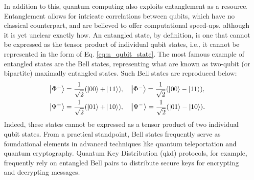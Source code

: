 In addition to this, quantum computing also exploits entanglement as a resource. Entanglement allows for intricate correlations between qubits, which have no classical counterpart, and are believed to offer computational speed-ups, although it is yet unclear exactly how. An entangled state, by definition, is one that cannot be expressed as the tensor product of individual qubit states, i.e., it cannot be represented in the form of Eq. \ref{eq:n_qubit_state}. The most famous example of entangled states are the Bell states, representing what are known as two-qubit (or bipartite) maximally entangled states. Such Bell states are reproduced below:
\begin{equation} %
  \begin{aligned}
  \ket{\Phi^+} &= \frac{1}{\sqrt{2}}(\ket{00} + \ket{11}), \quad
  \ket{\Phi^-} = \frac{1}{\sqrt{2}}(\ket{00} - \ket{11}), \\
  \ket{\Psi^+} &= \frac{1}{\sqrt{2}}(\ket{01} + \ket{10}), \quad
  \ket{\Psi^-} = \frac{1}{\sqrt{2}}(\ket{01} - \ket{10}).
  \end{aligned}
\end{equation}
Indeed, these states cannot be expressed as a tensor product of two individual qubit states. From a practical standpoint, Bell states frequently serve as foundational elements in advanced techniques like quantum teleportation and quantum cryptography. Quantum Key Distribution (\acrshort{qkd}) protocols, for example, frequently rely on entangled Bell pairs to distribute secure keys for encrypting and decrypting messages.

